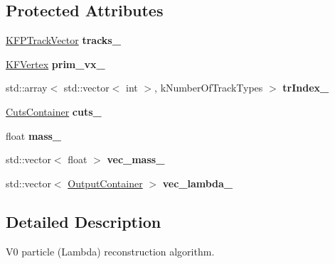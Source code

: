 \subsection*{Protected Attributes}
\begin{DoxyCompactItemize}
\item 
\hyperlink{classKFPTrackVector}{K\+F\+P\+Track\+Vector} {\bfseries tracks\+\_\+}\hypertarget{classSimpleFinder_a224eaba7c5a7830b730d15ae29e44088}{}\label{classSimpleFinder_a224eaba7c5a7830b730d15ae29e44088}

\item 
\hyperlink{classKFVertex}{K\+F\+Vertex} {\bfseries prim\+\_\+vx\+\_\+}\hypertarget{classSimpleFinder_aac6ae91fb844a0f67ffc31fe4ad09993}{}\label{classSimpleFinder_aac6ae91fb844a0f67ffc31fe4ad09993}

\item 
std\+::array$<$ std\+::vector$<$ int $>$, k\+Number\+Of\+Track\+Types $>$ {\bfseries tr\+Index\+\_\+}\hypertarget{classSimpleFinder_a290194488ca3d915194d9e5cc7169863}{}\label{classSimpleFinder_a290194488ca3d915194d9e5cc7169863}

\item 
\hyperlink{classCutsContainer}{Cuts\+Container} {\bfseries cuts\+\_\+}\hypertarget{classSimpleFinder_a7c2a911d99f8e634e47a68593d57291c}{}\label{classSimpleFinder_a7c2a911d99f8e634e47a68593d57291c}

\item 
float {\bfseries mass\+\_\+}\hypertarget{classSimpleFinder_aaa7bb0079c554838652b89905f1f0684}{}\label{classSimpleFinder_aaa7bb0079c554838652b89905f1f0684}

\item 
std\+::vector$<$ float $>$ {\bfseries vec\+\_\+mass\+\_\+}\hypertarget{classSimpleFinder_a1a259ed53902aefa2616e122114f7ef0}{}\label{classSimpleFinder_a1a259ed53902aefa2616e122114f7ef0}

\item 
std\+::vector$<$ \hyperlink{classOutputContainer}{Output\+Container} $>$ {\bfseries vec\+\_\+lambda\+\_\+}\hypertarget{classSimpleFinder_a80c1c67985d99f3ff0f68b9773fb7aa9}{}\label{classSimpleFinder_a80c1c67985d99f3ff0f68b9773fb7aa9}

\end{DoxyCompactItemize}


\subsection{Detailed Description}
V0 particle (Lambda) reconstruction algorithm. 

